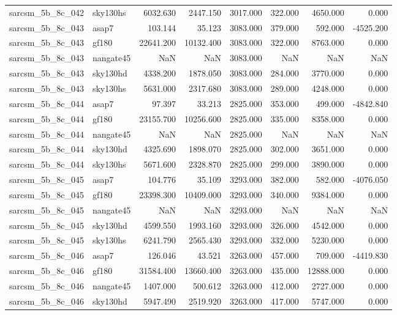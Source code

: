 \begin{tabular}{llrrrrrr}
sarcsm\_5b\_8c\_042 & sky130hs & 6032.630 & 2447.150 & 3017.000 & 322.000 & 4650.000 & 0.000 \\
sarcsm\_5b\_8c\_043 & asap7 & 103.144 & 35.123 & 3083.000 & 379.000 & 592.000 & -4525.200 \\
sarcsm\_5b\_8c\_043 & gf180 & 22641.200 & 10132.400 & 3083.000 & 322.000 & 8763.000 & 0.000 \\
sarcsm\_5b\_8c\_043 & nangate45 & NaN & NaN & 3083.000 & NaN & NaN & NaN \\
sarcsm\_5b\_8c\_043 & sky130hd & 4338.200 & 1878.050 & 3083.000 & 284.000 & 3770.000 & 0.000 \\
sarcsm\_5b\_8c\_043 & sky130hs & 5631.000 & 2317.680 & 3083.000 & 289.000 & 4248.000 & 0.000 \\
sarcsm\_5b\_8c\_044 & asap7 & 97.397 & 33.213 & 2825.000 & 353.000 & 499.000 & -4842.840 \\
sarcsm\_5b\_8c\_044 & gf180 & 23155.700 & 10256.600 & 2825.000 & 335.000 & 8358.000 & 0.000 \\
sarcsm\_5b\_8c\_044 & nangate45 & NaN & NaN & 2825.000 & NaN & NaN & NaN \\
sarcsm\_5b\_8c\_044 & sky130hd & 4325.690 & 1898.070 & 2825.000 & 302.000 & 3651.000 & 0.000 \\
sarcsm\_5b\_8c\_044 & sky130hs & 5671.600 & 2328.870 & 2825.000 & 299.000 & 3890.000 & 0.000 \\
sarcsm\_5b\_8c\_045 & asap7 & 104.776 & 35.109 & 3293.000 & 382.000 & 582.000 & -4076.050 \\
sarcsm\_5b\_8c\_045 & gf180 & 23398.300 & 10409.000 & 3293.000 & 340.000 & 9384.000 & 0.000 \\
sarcsm\_5b\_8c\_045 & nangate45 & NaN & NaN & 3293.000 & NaN & NaN & NaN \\
sarcsm\_5b\_8c\_045 & sky130hd & 4599.550 & 1993.160 & 3293.000 & 326.000 & 4542.000 & 0.000 \\
sarcsm\_5b\_8c\_045 & sky130hs & 6241.790 & 2565.430 & 3293.000 & 332.000 & 5230.000 & 0.000 \\
sarcsm\_5b\_8c\_046 & asap7 & 126.046 & 43.521 & 3263.000 & 457.000 & 709.000 & -4419.830 \\
sarcsm\_5b\_8c\_046 & gf180 & 31584.400 & 13660.400 & 3263.000 & 435.000 & 12888.000 & 0.000 \\
sarcsm\_5b\_8c\_046 & nangate45 & 1407.000 & 500.612 & 3263.000 & 412.000 & 2727.000 & 0.000 \\
sarcsm\_5b\_8c\_046 & sky130hd & 5947.490 & 2519.920 & 3263.000 & 417.000 & 5747.000 & 0.000 \\

\end{tabular}
